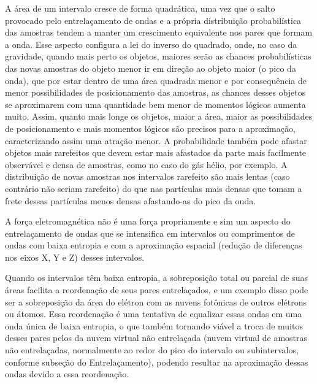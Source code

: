 A área de um intervalo cresce de forma quadrática, uma vez que o salto provocado pelo entrelaçamento de ondas e a própria distribuição probabilística das amostras tendem a manter um crescimento equivalente nos pares que formam a onda. Esse aspecto configura a lei do inverso do quadrado, onde, no caso da gravidade, quando mais perto os objetos, maiores serão as chances probabilísticas das novas amostras do objeto menor ir em direção ao objeto maior (o pico da onda), que por estar dentro de uma área quadrada menor e por consequência de menor possibilidades de posicionamento das amostras, as chances desses objetos se aproximarem com uma quantidade bem menor de momentos lógicos aumenta muito. Assim, quanto mais longe os objetos, maior a área, maior as possibilidades de posicionamento e mais momentos lógicos são precisos para a aproximação, caracterizando assim uma atração menor. A probabilidade também pode afastar objetos mais rarefeitos que devem estar mais afastados da parte mais facilmente observável e densa de amostras, como no caso do gás hélio, por exemplo. A distribuição de novas amostras nos intervalos rarefeito são mais lentas (caso contrário não seriam rarefeito) do que nas partículas mais densas que tomam a frete dessas partículas menos densas afastando-as do pico da onda. 

A força eletromagnética não é uma força propriamente e sim um aspecto do entrelaçamento de ondas que se intensifica em intervalos ou comprimentos de ondas com baixa entropia e com a aproximação espacial (redução de diferenças nos eixos X, Y e Z) desses intervalos.

Quando os intervalos têm baixa entropia, a sobreposição total ou parcial de suas áreas facilita a reordenação de seus pares entrelaçados, e um exemplo disso pode ser a sobreposição da área do elétron com as nuvens fotônicas de outros elétrons ou átomos. Essa reordenação é uma tentativa de equalizar essas ondas em uma onda única de baixa entropia, o que também tornando viável a troca de muitos desses pares pelos da nuvem virtual não entrelaçada (nuvem virtual de amostras não entrelaçadas, normalmente ao redor do pico do intervalo ou subintervalos, conforme subseção do Entrelaçamento), podendo resultar na aproximação dessas ondas devido a essa reordenação.

